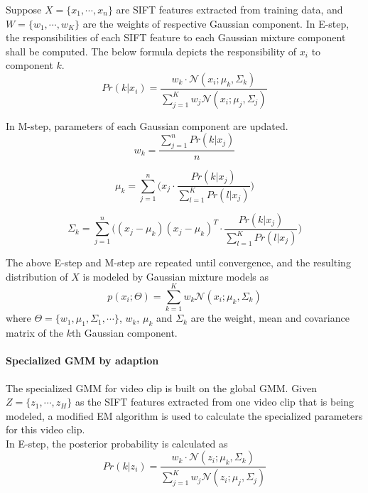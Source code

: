 	\noindent Suppose $X = \{x_1, \cdots, x_n\}$ are SIFT features extracted from training data, and $W = \{w_1, \cdots, w_K\}$ are the weights of respective Gaussian component. In E-step, the responsibilities of each SIFT feature to each Gaussian mixture component shall be computed. The below formula depicts the responsibility of $x_i$ to component $k$.
	\begin{equation}
	Pr(k|x_i) = \frac{w_k \cdot \mathcal{N} (x_i ; \mu_k, \Sigma_k) }{\sum_{j=1}^{K}w_j \mathcal{N}(x_i ; \mu_j, \Sigma_j)}
	\end{equation}   

	\noindent In M-step, parameters of each Gaussian component are updated.
	\begin{equation}
	w_k = \frac{\sum_{j=1}^{n} Pr(k|x_j)}{n}
	\end{equation}

	\begin{equation}
	\mu_k = \sum_{j=1}^{n} \big( x_j \cdot \frac{Pr(k|x_j)}{\sum_{l=1}^{K} Pr(l|x_j)} \big)
	\end{equation}

	\begin{equation}
	\Sigma_k = \sum_{j=1}^{n} \big(  (x_j - \mu_k)(x_j - \mu_k)^T \cdot \frac{Pr(k|x_j)}{\sum_{l=1}^{K} Pr(l|x_j)} \big)
	\end{equation}

	\noindent The above E-step and M-step are repeated until convergence, and the resulting distribution of $X$ is modeled by Gaussian mixture models as 
	\begin{equation}
	p(x_i; \Theta) = \sum_{k=1}^{K} w_k \mathcal{N}(x_i; \mu_k, \Sigma_k)
	\end{equation}
	where $\Theta = \{w_1, \mu_1, \Sigma_1, \cdots \}$, $w_k$, $\mu_k$ and $\Sigma_k$ are the weight, mean and covariance matrix of the $k$th Gaussian component. 

	\paragraph{Specialized GMM by adaption}
	The specialized GMM for video clip is built on the global GMM. Given $Z = \{z_1,\cdots,z_H\}$ as the SIFT features extracted from one video clip that is being modeled, a modified EM algorithm is used to calculate the specialized parameters for this video clip. \\

	\noindent In E-step, the posterior probability is calculated as
	\begin{equation}
	Pr(k|z_i) = \frac{w_k \cdot \mathcal{N} (z_i ; \mu_k, \Sigma_k) }{\sum_{j=1}^{K}w_j \mathcal{N}(z_i ; \mu_j, \Sigma_j)}
	\end{equation}   

